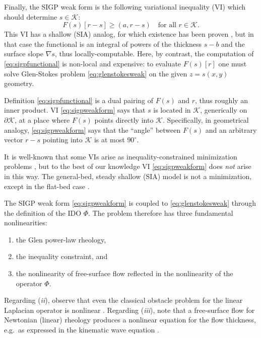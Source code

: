 \documentclass[letterpaper,final,12pt,reqno]{amsart}
\theoremstyle{claim}
\newcommand{\grad}{\nabla}
\newcommand{\ip}[2]{\left(#1,#2\right)}
\numberwithin{equation}{section}
\numberwithin{figure}{section}
\numberwithin{table}{section}
\numberwithin{theorem}{section}
\begin{document}
Finally, the SIGP weak form is the following variational inequality (VI) \cite{KinderlehrerStampacchia1980} which should determine $s\in\mathcal{K}$:
\begin{equation}
F(s)[r - s] \ge \ip{a}{r-s} \quad \text{for all $r \in \mathcal{K}$.}  \label{eq:sigpweakform}
\end{equation}
This VI has a shallow (SIA) analog, for which existence has been proven \cite{JouvetBueler2012}, but in that case the functional is an integral of powers of the thickness $s-b$ and the surface slope $\grad s$, thus locally-computable.  Here, by contrast, the computation of \eqref{eq:sigpfunctional} is non-local and expensive: to evaluate $F(s)[r]$ one must solve Glen-Stokes problem \eqref{eq:glenstokesweak} on the given $z=s(x,y)$ geometry.

Definition \eqref{eq:sigpfunctional} is a dual pairing of $F(s)$ and $r$, thus roughly an inner product.  VI \eqref{eq:sigpweakform} says that $s$ is located in $\mathcal{K}$, generically on $\partial\mathcal{K}$, at a place where $F(s)$ points directly into $\mathcal{K}$.  Specifically, in geometrical analogy, \eqref{eq:sigpweakform} says that the ``angle'' between $F(s)$ and an arbitrary vector $r-s$ pointing into $\mathcal{K}$ is at most $90^\circ$.

It is well-known that some VIs arise as inequality-constrained minimization problems \cite{GraeserKornhuber2009,KinderlehrerStampacchia1980}, but to the best of our knowledge VI \eqref{eq:sigpweakform} does \emph{not} arise in this way.  The general-bed, steady shallow (SIA) model is not a minimization, except in the flat-bed case \cite{JouvetBueler2012}.

The SIGP weak form \eqref{eq:sigpweakform} is coupled to \eqref{eq:glenstokesweak} through the definition of the IDO $\Phi$.  The problem therefore has three fundamental nonlinearities:
\renewcommand{\labelenumi}{(\emph{\roman{enumi}})}
\begin{enumerate}
\item the Glen power-law rheology,
\item the inequality constraint, and
\item the nonlinearity of free-surface flow reflected in the nonlinearity of the operator $\Phi$.
\end{enumerate}
Regarding (\emph{ii}), observe that even the classical obstacle problem for the linear Laplacian operator is nonlinear \cite{KinderlehrerStampacchia1980}.  Regarding (\emph{iii}), note that a free-surface flow for Newtonian (linear) rheology produces a nonlinear equation for the flow thickness, e.g.~as expressed in the kinematic wave equation \cite{Ockendonetal2003}.
\end{document}
